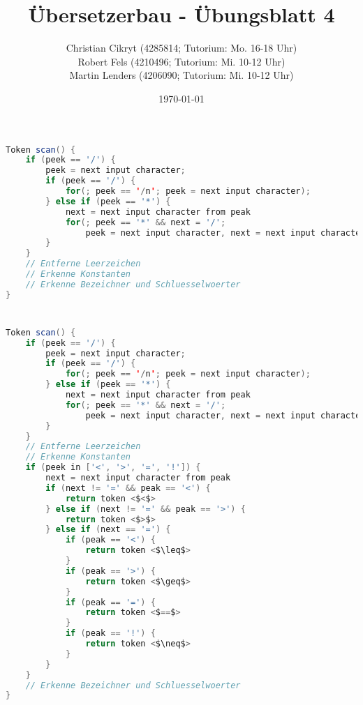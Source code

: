 \documentclass[a4paper,10pt]{scrartcl}
\title{Übersetzerbau - Übungsblatt 4}
\author{Christian Cikryt (4285814; Tutorium: Mo. 16-18 Uhr)\\
  Robert Fels (4210496; Tutorium: Mi. 10-12 Uhr)\\
  Martin Lenders (4206090; Tutorium: Mi. 10-12 Uhr)
  }
\date{\today}
\begin{document}
\maketitle

\section{}
\begin{lstlisting}[language=Java]
Token scan() {
    if (peek == '/') {
        peek = next input character;
        if (peek == '/') {
            for(; peek == '/n'; peek = next input character);
        } else if (peek == '*') {
            next = next input character from peak
            for(; peek == '*' && next = '/'; 
                peek = next input character, next = next input character from peak);
        }
    }
    // Entferne Leerzeichen
    // Erkenne Konstanten
    // Erkenne Bezeichner und Schluesselwoerter
}
\end{lstlisting}


\section{}
\begin{lstlisting}[language=Java,mathescape=True]
Token scan() {
    if (peek == '/') {
        peek = next input character;
        if (peek == '/') {
            for(; peek == '/n'; peek = next input character);
        } else if (peek == '*') {
            next = next input character from peak
            for(; peek == '*' && next = '/'; 
                peek = next input character, next = next input character from peak);
        }
    }
    // Entferne Leerzeichen
    // Erkenne Konstanten
    if (peek in ['<', '>', '=', '!']) {
        next = next input character from peak
        if (next != '=' && peak == '<') {
            return token <$<$>
        } else if (next != '=' && peak == '>') {
            return token <$>$>
        } else if (next == '=') {
            if (peak == '<') {
                return token <$\leq$>
            }
            if (peak == '>') {
                return token <$\geq$>
            }
            if (peak == '=') {
                return token <$==$>
            }
            if (peak == '!') {
                return token <$\neq$>
            }
        }
    }
    // Erkenne Bezeichner und Schluesselwoerter
}
\end{lstlisting}

\section{}
\end{document}
